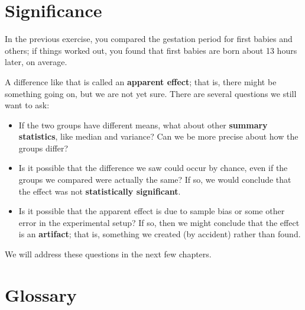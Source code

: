 \documentclass[12pt]{book}
\begin{document}
\section{Significance}

In the previous exercise, you compared the gestation period for first
babies and others; if things worked out, you found that first
babies are born about 13 hours later, on average.

A difference like that is called an {\bf apparent effect}; that is,
there might be something going on, but we are not yet sure.  There are
several questions we still want to ask:

\begin{itemize}

\item If the two groups have different means, what about other {\bf
  summary statistics}, like median and variance?  Can we be more
  precise about how the groups differ?

\item Is it possible that the difference we saw could occur by chance,
  even if the groups we compared were actually the same?  If so,
  we would conclude that the effect was not {\bf statistically
    significant}.

\item Is it possible that the apparent effect is due to sample bias or
  some other error in the experimental setup?  If so, then we might
  conclude that the effect is an {\bf artifact}; that is, something we
  created (by accident) rather than found. 

\end{itemize}

We will address these questions in the next few chapters.


\section{Glossary}
\end{document}
